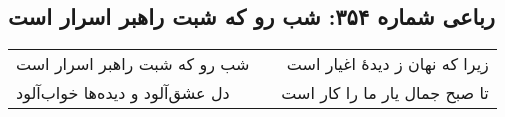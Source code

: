\begin{center}
\section*{رباعی شماره ۳۵۴: شب رو که شبت راهبر اسرار است}
\label{sec:0354}
\begin{longtable}{l p{0.5cm} r}
شب رو که شبت راهبر اسرار است
&&
زیرا که نهان ز دیدهٔ اغیار است
\\
دل عشق‌آلود و دیده‌ها خواب‌آلود
&&
تا صبح جمال یار ما را کار است
\\
\end{longtable}
\end{center}
